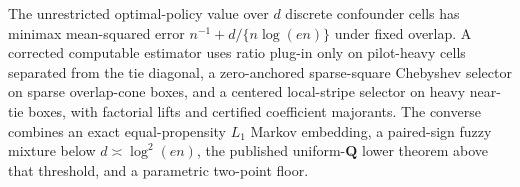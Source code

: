 The unrestricted optimal-policy value over \(d\) discrete confounder cells has minimax mean-squared error \(n^{-1}+d/\{n\log(en)\}\) under fixed overlap.  A corrected computable estimator uses ratio plug-in only on pilot-heavy cells separated from the tie diagonal, a zero-anchored sparse-square Chebyshev selector on sparse overlap-cone boxes, and a centered local-stripe selector on heavy near-tie boxes, with factorial lifts and certified coefficient majorants.  The converse combines an exact equal-propensity \(L_1\) Markov embedding, a paired-sign fuzzy mixture below \(d\asymp\log^2(en)\), the published uniform-\(\mathbf Q\) lower theorem above that threshold, and a parametric two-point floor.